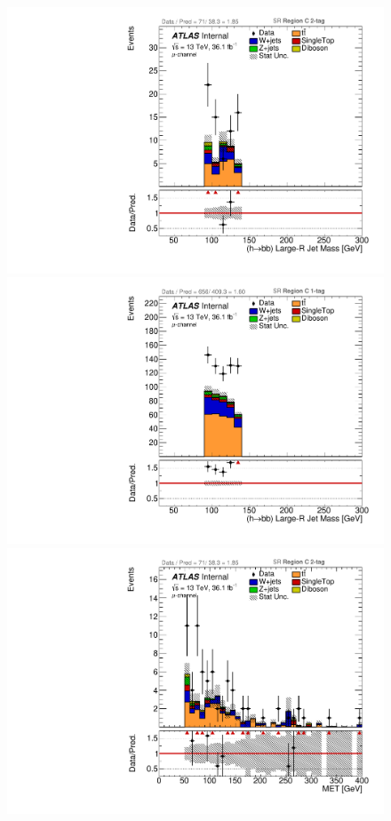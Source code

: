 \begin{figure}[!htbp]
\begin{center}
\includegraphics[scale=0.23]{./figures/boosted/ABCD/muon_SR_RegionC_HbbMass}
\includegraphics[scale=0.23]{./figures/boosted/ABCD/muon_SR_RegionC_1tag_HbbMass}\\
\includegraphics[scale=0.23]{./figures/boosted/ABCD/muon_SR_RegionC_MET}

\end{center}
\end{figure}
